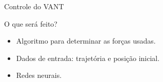 \begin{frame}{Controle do VANT}

\begin{block}{O que será feito?}
    \begin{itemize}
        \item Algoritmo para determinar as forças usadas.
        \item Dados de entrada: trajetória e posição inicial.
        \item Redes neurais.
    \end{itemize} 
\end{block}
\vfill
\begin{figure}
\centering

\end{figure}
\end{frame}